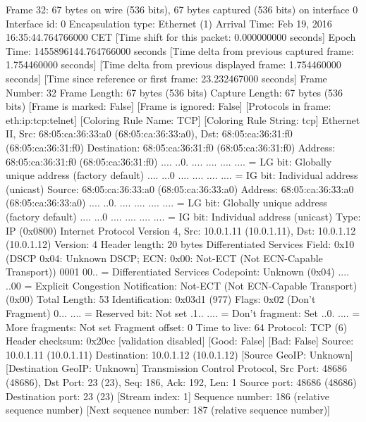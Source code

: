 Frame 32: 67 bytes on wire (536 bits), 67 bytes captured (536 bits) on interface 0
    Interface id: 0
    Encapsulation type: Ethernet (1)
    Arrival Time: Feb 19, 2016 16:35:44.764766000 CET
    [Time shift for this packet: 0.000000000 seconds]
    Epoch Time: 1455896144.764766000 seconds
    [Time delta from previous captured frame: 1.754460000 seconds]
    [Time delta from previous displayed frame: 1.754460000 seconds]
    [Time since reference or first frame: 23.232467000 seconds]
    Frame Number: 32
    Frame Length: 67 bytes (536 bits)
    Capture Length: 67 bytes (536 bits)
    [Frame is marked: False]
    [Frame is ignored: False]
    [Protocols in frame: eth:ip:tcp:telnet]
    [Coloring Rule Name: TCP]
    [Coloring Rule String: tcp]
Ethernet II, Src: 68:05:ca:36:33:a0 (68:05:ca:36:33:a0), Dst: 68:05:ca:36:31:f0 (68:05:ca:36:31:f0)
    Destination: 68:05:ca:36:31:f0 (68:05:ca:36:31:f0)
        Address: 68:05:ca:36:31:f0 (68:05:ca:36:31:f0)
        .... ..0. .... .... .... .... = LG bit: Globally unique address (factory default)
        .... ...0 .... .... .... .... = IG bit: Individual address (unicast)
    Source: 68:05:ca:36:33:a0 (68:05:ca:36:33:a0)
        Address: 68:05:ca:36:33:a0 (68:05:ca:36:33:a0)
        .... ..0. .... .... .... .... = LG bit: Globally unique address (factory default)
        .... ...0 .... .... .... .... = IG bit: Individual address (unicast)
    Type: IP (0x0800)
Internet Protocol Version 4, Src: 10.0.1.11 (10.0.1.11), Dst: 10.0.1.12 (10.0.1.12)
    Version: 4
    Header length: 20 bytes
    Differentiated Services Field: 0x10 (DSCP 0x04: Unknown DSCP; ECN: 0x00: Not-ECT (Not ECN-Capable Transport))
        0001 00.. = Differentiated Services Codepoint: Unknown (0x04)
        .... ..00 = Explicit Congestion Notification: Not-ECT (Not ECN-Capable Transport) (0x00)
    Total Length: 53
    Identification: 0x03d1 (977)
    Flags: 0x02 (Don't Fragment)
        0... .... = Reserved bit: Not set
        .1.. .... = Don't fragment: Set
        ..0. .... = More fragments: Not set
    Fragment offset: 0
    Time to live: 64
    Protocol: TCP (6)
    Header checksum: 0x20cc [validation disabled]
        [Good: False]
        [Bad: False]
    Source: 10.0.1.11 (10.0.1.11)
    Destination: 10.0.1.12 (10.0.1.12)
    [Source GeoIP: Unknown]
    [Destination GeoIP: Unknown]
Transmission Control Protocol, Src Port: 48686 (48686), Dst Port: 23 (23), Seq: 186, Ack: 192, Len: 1
    Source port: 48686 (48686)
    Destination port: 23 (23)
    [Stream index: 1]
    Sequence number: 186    (relative sequence number)
    [Next sequence number: 187    (relative sequence number)]
